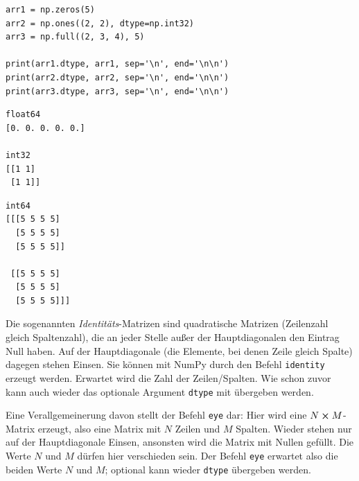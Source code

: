 \begin{codebox}
\begin{verbatim}
arr1 = np.zeros(5)
arr2 = np.ones((2, 2), dtype=np.int32)
arr3 = np.full((2, 3, 4), 5)

print(arr1.dtype, arr1, sep='\n', end='\n\n')
print(arr2.dtype, arr2, sep='\n', end='\n\n')
print(arr3.dtype, arr3, sep='\n', end='\n\n')
\end{verbatim}
\end{codebox}

\begin{cmdbox}
\begin{verbatim}
float64
[0. 0. 0. 0. 0.]

int32
[[1 1]
 [1 1]]
\end{verbatim}
\end{cmdbox}
%
\begin{cmdbox}[]
\begin{verbatim}
int64
[[[5 5 5 5]
  [5 5 5 5]
  [5 5 5 5]]

 [[5 5 5 5]
  [5 5 5 5]
  [5 5 5 5]]]
\end{verbatim}
\end{cmdbox}

Die sogenannten \emph{Identitäts}-Matrizen sind quadratische Matrizen (Zeilenzahl gleich Spaltenzahl), die an jeder Stelle außer der Hauptdiagonalen den Eintrag Null haben. Auf der Hauptdiagonale (die Elemente, bei denen Zeile gleich Spalte) dagegen stehen Einsen. Sie können mit NumPy durch den Befehl \texttt{identity} erzeugt werden. Erwartet wird die Zahl der Zeilen/Spalten. Wie schon zuvor kann auch wieder das optionale Argument \texttt{dtype} mit übergeben werden.

Eine Verallgemeinerung davon stellt der Befehl \texttt{eye} dar: Hier wird eine $N \cross M$-Matrix erzeugt, also eine Matrix mit $N$ Zeilen und $M$ Spalten. Wieder stehen nur auf der Hauptdiagonale Einsen, ansonsten wird die Matrix mit Nullen gefüllt. Die Werte $N$ und $M$ dürfen hier verschieden sein. Der Befehl \texttt{eye} erwartet also die beiden Werte $N$ und $M$; optional kann wieder \texttt{dtype} übergeben werden.

